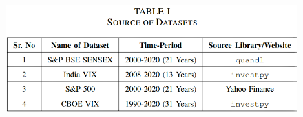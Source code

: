 \documentclass[conference]{IEEEtran}
\begin{document}

\vspace{-0.25in}
\begin{figure}[htbp]
    \centering
    \includegraphics[width = \columnwidth]{images/source-of-datasets.PNG}
\end{figure}
\end{document}

